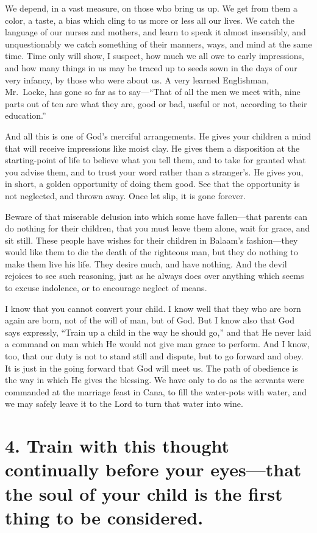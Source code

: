 \documentclass[
]{book}
\begin{document}
We depend, in a vast measure, on those who bring us up. We get from them a color, a taste, a bias which cling to us more or less all our lives. We catch the language of our nurses and mothers, and learn to speak it almost insensibly, and unquestionably we catch something of their manners, ways, and mind at the same time. Time only will show, I suspect, how much we all owe to early impressions, and how many things in us may be traced up to seeds sown in the days of our very infancy, by those who were about us. A very learned Englishman, Mr.~Locke, has gone so far as to say---``That of all the men we meet with, nine parts out of ten are what they are, good or bad, useful or not, according to their education.''

And all this is one of God's merciful arrangements. He gives your children a mind that will receive impressions like moist clay. He gives them a disposition at the starting-point of life to believe what you tell them, and to take for granted what you advise them, and to trust your word rather than a stranger's. He gives you, in short, a golden opportunity of doing them good. See that the opportunity is not neglected, and thrown away. Once let slip, it is gone forever.

Beware of that miserable delusion into which some have fallen---that parents can do nothing for their children, that you must leave them alone, wait for grace, and sit still. These people have wishes for their children in Balaam's fashion---they would like them to die the death of the righteous man, but they do nothing to make them live his life. They desire much, and have nothing. And the devil rejoices to see such reasoning, just as he always does over anything which seems to excuse indolence, or to encourage neglect of means.

I know that you cannot convert your child. I know well that they who are born again are born, not of the will of man, but of God. But I know also that God says expressly, ``Train up a child in the way he should go,'' and that He never laid a command on man which He would not give man grace to perform. And I know, too, that our duty is not to stand still and dispute, but to go forward and obey. It is just in the going forward that God will meet us. The path of obedience is the way in which He gives the blessing. We have only to do as the servants were commanded at the marriage feast in Cana, to fill the water-pots with water, and we may safely leave it to the Lord to turn that water into wine.

\hypertarget{train-with-this-thought-continually-before-your-eyesthat-the-soul-of-your-child-is-the-first-thing-to-be-considered.}{%
\section*{4. Train with this thought continually before your eyes---that the soul of your child is the first thing to be considered.}\label{train-with-this-thought-continually-before-your-eyesthat-the-soul-of-your-child-is-the-first-thing-to-be-considered.}}
\end{document}
